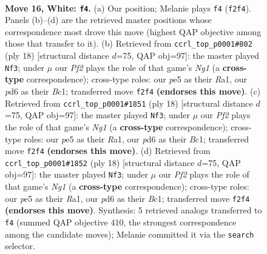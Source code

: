 \documentclass[11pt]{article}
\begin{document}
\clearpage

\begin{figure}[p]\centering
\begin{subfigure}{0.46\textwidth}\centering
\resizebox{\linewidth}{!}{%
\newchessgame
\chessboard[
  setfen={rn1qkbr1/5p2/3p1np1/2pPp3/4P3/1PN1B2N/P2K1P2/R4Q1R w q - 1 16},
  showmover=false,
  pgfstyle=straightmove, color=movearrow, markmove={f2-f4}
]}
\caption{}
\end{subfigure}\hfill
\begin{subfigure}{0.46\textwidth}\centering
\resizebox{\linewidth}{!}{%
\newchessgame
\chessboard[
  setfen={rn1qk2r/4ppbp/3p1np1/2pP4/4P3/2N3P1/PP3P1P/R1BQ1KNR w kq - 1 10},
  showmover=false,
  pgfstyle=straightmove, color=movearrow, markmove={g1-f3}
]}
\caption{}
\end{subfigure}
\\[4pt]
\begin{subfigure}{0.46\textwidth}\centering
\resizebox{\linewidth}{!}{%
\newchessgame
\chessboard[
  setfen={rn1qk2r/4ppbp/3p1np1/2pP4/4P3/2N3P1/PP3P1P/R1BQ1KNR w kq - 1 10},
  showmover=false,
  pgfstyle=straightmove, color=movearrow, markmove={g1-f3}
]}
\caption{}
\end{subfigure}\hfill
\begin{subfigure}{0.46\textwidth}\centering
\resizebox{\linewidth}{!}{%
\newchessgame
\chessboard[
  setfen={rn1qk2r/4ppbp/3p1np1/2pP4/4P3/2N3P1/PP3P1P/R1BQ1KNR w kq - 1 10},
  showmover=false,
  pgfstyle=straightmove, color=movearrow, markmove={g1-f3}
]}
\caption{}
\end{subfigure}
\caption{\textbf{Move 16, White: \texttt{f4}.} (a) Our position; Melanie plays \texttt{f4} (\texttt{f2f4}). Panels (b)--(d) are the retrieved master positions whose correspondence most drove this move (highest QAP objective among those that transfer to it). (b) Retrieved from \texttt{ccrl\_top\_p0001\#802} (ply 18) [structural distance $d$=75, QAP obj=97]: the master played \texttt{Nf3}; under $\mu$ our \emph{Pf2} plays the role of that game's \emph{Ng1} (a \textbf{cross-type} correspondence); cross-type roles: our \emph{p}e5 as their \emph{R}a1, our \emph{p}d6 as their \emph{B}c1; transferred move \texttt{f2f4} \textbf{(endorses this move)}. (c) Retrieved from \texttt{ccrl\_top\_p0001\#1851} (ply 18) [structural distance $d$=75, QAP obj=97]: the master played \texttt{Nf3}; under $\mu$ our \emph{Pf2} plays the role of that game's \emph{Ng1} (a \textbf{cross-type} correspondence); cross-type roles: our \emph{p}e5 as their \emph{R}a1, our \emph{p}d6 as their \emph{B}c1; transferred move \texttt{f2f4} \textbf{(endorses this move)}. (d) Retrieved from \texttt{ccrl\_top\_p0001\#1852} (ply 18) [structural distance $d$=75, QAP obj=97]: the master played \texttt{Nf3}; under $\mu$ our \emph{Pf2} plays the role of that game's \emph{Ng1} (a \textbf{cross-type} correspondence); cross-type roles: our \emph{p}e5 as their \emph{R}a1, our \emph{p}d6 as their \emph{B}c1; transferred move \texttt{f2f4} \textbf{(endorses this move)}. Synthesis: 5 retrieved analogs transferred to \texttt{f4} (summed QAP objective 410, the strongest correspondence among the candidate moves); Melanie committed it via the \texttt{search} selector.}
\label{fig:thought-m30}
\end{figure}
\end{document}

